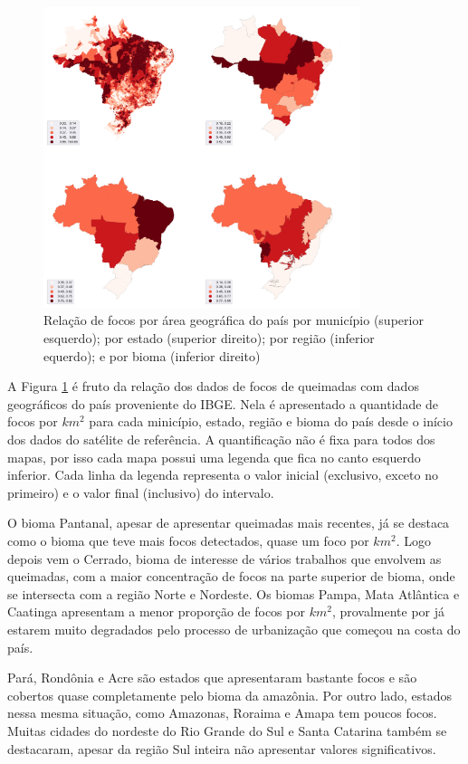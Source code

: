 \documentclass[cic,tc]{iiufrgs}
\begin{document}
\begin{figure}[!htb]
    \caption{Relação de focos por área geográfica do país por município (superior esquerdo); por estado (superior direito); por região (inferior equerdo); e por bioma (inferior direito)}
    \begin{center}
        \includegraphics[width=25em]{brasil_focos}
    \end{center}
    \label{fig:brasil_focos}
\end{figure}

A Figura \ref{fig:brasil_focos} é fruto da relação dos dados de focos de queimadas com dados geográficos do país proveniente do IBGE. Nela é apresentado a quantidade de focos por $km^2$ para cada minicípio, estado, região e bioma do país desde o início dos dados do satélite de referência. A quantificação não é fixa para todos dos mapas, por isso cada mapa possui uma legenda que fica no canto esquerdo inferior. Cada linha da legenda representa o valor inicial (exclusivo, exceto no primeiro) e o valor final (inclusivo) do intervalo. 

O bioma Pantanal, apesar de apresentar queimadas mais recentes, já se destaca como o bioma que teve mais focos detectados, quase um foco por $km^2$. Logo depois vem o Cerrado, bioma de interesse de vários trabalhos que envolvem as queimadas, com a maior concentração de focos na parte superior de bioma, onde se intersecta com a região Norte e Nordeste. Os biomas Pampa, Mata Atlântica e Caatinga apresentam a menor proporção de focos por $km^2$, provalmente por já estarem muito degradados pelo processo de urbanização que começou na costa do país.

Pará, Rondônia e Acre são estados que apresentaram bastante focos e são cobertos quase completamente pelo bioma da amazônia. Por outro lado, estados nessa mesma situação, como Amazonas, Roraima e Amapa tem poucos focos. Muitas cidades do nordeste do Rio Grande do Sul e Santa Catarina também se destacaram, apesar da região Sul inteira não apresentar valores significativos. 
\end{document}
